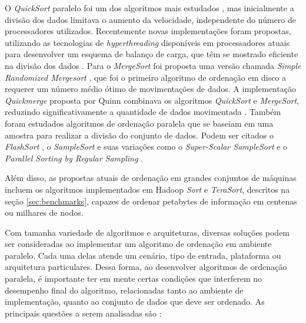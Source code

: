 O \textit{QuickSort} paralelo foi um dos algoritmos mais estudados \cite{Deminet:1982, Quinn:1994, Sanders:1997}, mas inicialmente a divisão dos dados limitava o aumento da velocidade, independente do número de processadores utilizados. Recentemente novas implementações foram propostas, utilizando as tecnologias  de \textit{hyperthreading} disponíveis em processadores atuais para desenvolver um esquema de balanço de carga, que têm se mostrado eficiente na divisão dos dados \cite{Parikh:2008}.
Para o \textit{MergeSort} foi proposta uma versão chamada \textit{Simple Randomized Mergesort} \cite{Barve:1996, Barve:2002}, que foi o primeiro algoritmo de ordenação em disco a requerer um número médio ótimo de movimentações de dados. 
 A implementação \textit{Quickmerge} proposta por Quinn combinava os algoritmos \textit{QuickSort} e \textit{MergeSort}, reduzindo significativamente a quantidade de dados movimentada \cite{Quinn:1988}. Também foram estudados algoritmos de ordenação paralela que se baseiam em uma amostra para realizar a divisão do conjunto de dados. Podem ser citados o \textit{FlashSort} \cite{Reif:1987}, o \textit{SampleSort} \cite{Huang:1983} e suas variações como o \textit{Super-Scalar SampleSort }\cite{Sanders:2004} e o \textit{Parallel Sorting by Regular Sampling} \cite{Shi:1992}.

Além disso, as propostas atuais de ordenação em grandes conjuntos de máquinas incluem os algoritmos implementados em Hadoop \textit{Sort} e \textit{TeraSort}, descritos na seção \ref{sec:benchmarks}, capazes de ordenar petabytes de informação em centenas ou milhares de nodos. 



Com tamanha variedade de algoritmos e arquiteturas, diversas soluções podem ser consideradas ao implementar um algoritmo de ordenação em ambiente paralelo. Cada uma delas atende um cenário, tipo de entrada, plataforma ou arquitetura particulares. Dessa forma, ao desenvolver algoritmos de ordenação paralela, é importante ter em mente certas condições que interferem no desempenho final do algoritmo, relacionadas tanto ao ambiente de implementação, quanto ao conjunto de dados que deve ser ordenado. As principais questões a serem analisadas são \cite{Kale:2010}:

